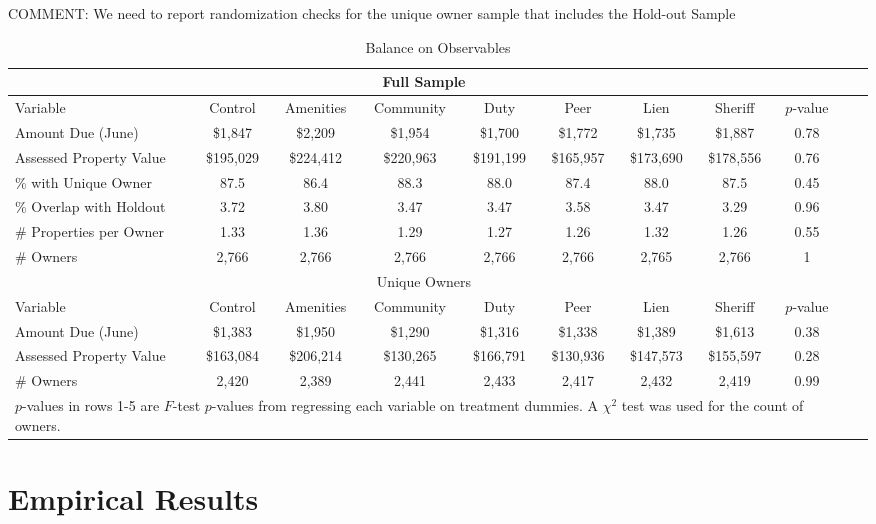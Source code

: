 \documentclass[12pt]{article}
\begin{document}
\noindent COMMENT: We need to report randomization checks for the unique owner sample that includes the Hold-out Sample	        

\begin{sidewaystable}[htbp]
\caption{Balance on Observables} \label{balance}
\bigskip
\centering
\begin{tabular}{l c c c c c c c c c c}
\hline
\multicolumn{9}{c}{Full Sample} \\
   \hline
Variable & Control & Amenities & Community & Duty & Peer & Lien & Sheriff & $p$-value \\ 
   \hline
Amount Due (June) & \$1,847 & \$2,209 & \$1,954 & \$1,700 & \$1,772 & \$1,735 & \$1,887 & 0.78 \\ 
  Assessed Property Value & \$195,029 & \$224,412 & \$220,963 & \$191,199 & \$165,957 & \$173,690 & \$178,556 & 0.76 \\ 
  \% with Unique Owner & 87.5 & 86.4 & 88.3 & 88.0 & 87.4 & 88.0 & 87.5 & 0.45 \\ 
  \% Overlap with Holdout & 3.72 & 3.80 & 3.47 & 3.47 & 3.58 & 3.47 & 3.29 & 0.96 \\ 
  \# Properties per Owner & 1.33 & 1.36 & 1.29 & 1.27 & 1.26 & 1.32 & 1.26 & 0.55 \\ 
  \# Owners & 2,766 & 2,766 & 2,766 & 2,766 & 2,766 & 2,765 & 2,766 & 1 \\ 
   \hline 
\multicolumn{9}{c}{Unique Owners} \\
   \hline
Variable & Control & Amenities & Community & Duty & Peer & Lien & Sheriff & $p$-value \\ 
   \hline
Amount Due (June) & \$1,383 & \$1,950 & \$1,290 & \$1,316 & \$1,338 & \$1,389 & \$1,613 & 0.38 \\ 
  Assessed Property Value & \$163,084 & \$206,214 & \$130,265 & \$166,791 & \$130,936 & \$147,573 & \$155,597 & 0.28 \\ 
  \# Owners & 2,420 & 2,389 & 2,441 & 2,433 & 2,417 & 2,432 & 2,419 & 0.99 \\ 
   \hline 
 \multicolumn{9}{l}{\scriptsize{$p$-values in rows 1-5 are $F$-test $p$-values from regressing each variable on treatment dummies. A $\chi^2$ test was used for the count of owners.}} \\ 
\end{tabular}

\end{sidewaystable}

\newpage

\section{Empirical Results}
\end{document}
